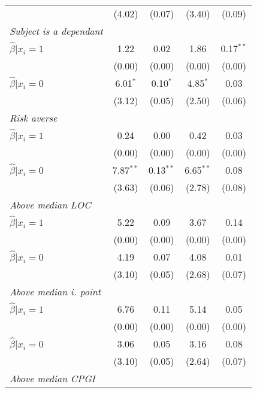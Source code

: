 \begin{table}[htbp]
{\begin{threeparttable}
\begin{tabular}{l*{4}{c}}
                &   (4.02)&   (0.07)&   (3.40)&   (0.09)\\
\textit{Subject is a dependant}&         &         &         &         \\
\hspace{0.5cm} \(\hat\beta|x_i=1\)&     1.22&     0.02&     1.86&0.17$^{**}$\\
                &   (0.00)&   (0.00)&   (0.00)&   (0.00)\\
\hspace{0.5cm} \(\hat\beta|x_i=0\)&6.01$^{*}$&0.10$^{*}$&4.85$^{*}$&     0.03\\
                &   (3.12)&   (0.05)&   (2.50)&   (0.06)\\
\textit{Risk averse}&         &         &         &         \\
\hspace{0.5cm} \(\hat\beta|x_i=1\)&     0.24&     0.00&     0.42&     0.03\\
                &   (0.00)&   (0.00)&   (0.00)&   (0.00)\\
\hspace{0.5cm} \(\hat\beta|x_i=0\)&7.87$^{**}$&0.13$^{**}$&6.65$^{**}$&     0.08\\
                &   (3.63)&   (0.06)&   (2.78)&   (0.08)\\
\textit{Above median LOC}&         &         &         &         \\
\hspace{0.5cm} \(\hat\beta|x_i=1\)&     5.22&     0.09&     3.67&     0.14\\
                &   (0.00)&   (0.00)&   (0.00)&   (0.00)\\
\hspace{0.5cm} \(\hat\beta|x_i=0\)&     4.19&     0.07&     4.08&     0.01\\
                &   (3.10)&   (0.05)&   (2.68)&   (0.07)\\
\textit{Above median i. point}&         &         &         &         \\
\hspace{0.5cm} \(\hat\beta|x_i=1\)&     6.76&     0.11&     5.14&     0.05\\
                &   (0.00)&   (0.00)&   (0.00)&   (0.00)\\
\hspace{0.5cm} \(\hat\beta|x_i=0\)&     3.06&     0.05&     3.16&     0.08\\
                &   (3.10)&   (0.05)&   (2.64)&   (0.07)\\
\textit{Above median CPGI}&         &         &         &         \\

\end{tabular}
\end{threeparttable}}
\end{table}
